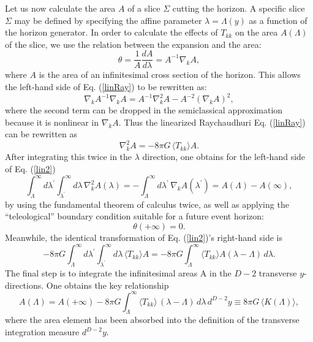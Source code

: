 \documentclass[12pt]{article}
\begin{document}
Let us now calculate the area $A$ of a slice $\Sigma$ cutting the horizon.  A specific slice $\Sigma$ may be defined by specifying the affine parameter $\lambda = \Lambda(y)$ as a function of the horizon generator.  In order to calculate the effects of $T_{kk}$ on the area $A(\Lambda)$ of the slice, we use the relation between the expansion and the area:
\begin{equation}
\theta = \frac{1}{A}\frac{dA}{d\lambda} = A^{-1} \nabla_k A,
\end{equation}
where $A$ is the area of an infinitesimal cross section of the horizon.  This allows the left-hand side of Eq. (\ref{linRay}) to be rewritten as:
\begin{equation}
\nabla_k A^{-1} \nabla_k A = A^{-1} \nabla_k^2 A - A^{-2} (\nabla_k A)^2,
\end{equation}
where the second term can be dropped in the semiclassical approximation because it is nonlinear in $\nabla_k A$.  Thus the linearized Raychaudhuri Eq. (\ref{linRay}) can be rewritten as
\begin{equation}\label{lin2}
\nabla_k^2 A = -8\pi G\,\langle T_{kk} \rangle A.
\end{equation}
After integrating this twice in the $\lambda$ direction, one obtains for the left-hand side of Eq. (\ref{lin2})
\begin{equation}
\int_\Lambda^\infty d\lambda^\prime \int_{\lambda^\prime}^\infty d\lambda\,\nabla_k^2 A(\lambda) =
-\int_\Lambda^\infty d\lambda^\prime\,\nabla_k A(\lambda^\prime) =
A(\Lambda) - A(\infty),
\end{equation}
by using the fundamental theorem of calculus twice, as well as applying the ``teleological'' boundary condition suitable for a future event horizon:
\begin{equation}
\theta(+\infty) = 0.
\end{equation}
Meanwhile, the identical transformation of Eq. (\ref{lin2})'s right-hand side is
\begin{equation}
-8\pi G \int_\Lambda^\infty d\lambda^\prime \int_{\lambda^\prime}^\infty d\lambda\, \langle T_{kk} \rangle A =
-8\pi G \int_\Lambda^\infty \langle T_{kk} \rangle A (\lambda - \Lambda)\,d\lambda.
\end{equation}
The final step is to integrate the infinitesimal areas A in the $D - 2$ transverse $y$-directions.  One obtains the key relationship
\begin{equation}\label{Tint}
A(\Lambda) = A(+\infty)
- 8\pi G \int_\Lambda^\infty \langle T_{kk} \rangle \,(\lambda - \Lambda) \,d\lambda\,d^{D-2}y \equiv 8\pi G\, \langle K(\Lambda) \rangle,
\end{equation}
where the area element has been absorbed into the definition of the transverse integration measure $d^{D-2}y$.
\end{document}
